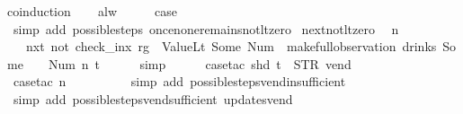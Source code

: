 \begin{isabellebody}
%
\isadelimproof
%
\endisadelimproof
%
\isatagproof
{}\isamarkupfalse%
{\isacharparenleft}coinduction{\isacharparenright}\isanewline
\ \ \isamarkupfalse%
\ alw\isanewline
\ \ \isamarkupfalse%
\ \isamarkupfalse%
\ {\isacharquery}case\isanewline
\ \ \ \ \isamarkupfalse%
\ {\isacharparenleft}simp\ add{\isacharcolon}\ possible{\isacharunderscore}steps{\isacharunderscore}{}\ once{\isacharunderscore}none{\isacharunderscore}remains{\isacharunderscore}not{\isacharunderscore}lt{\isacharunderscore}zero{\isacharparenright}\isanewline
{}\isamarkupfalse%
%
\endisatagproof
{\isafoldproof}%
%
\isadelimproof
\isanewline
%
\endisadelimproof
\isanewline
{}\isamarkupfalse%
\ next{\isacharunderscore}not{\isacharunderscore}lt{\isacharunderscore}zero{\isacharcolon}\isanewline
\ \ {\isachardoublequoteopen}n\ {\isasymge}\ {}\ {\isasymLongrightarrow}\isanewline
\ \ \ {\isacharparenleft}nxt\ {\isacharparenleft}not\ {\isacharparenleft}check_inx\ rg\ {}\ ValueLt\ {\isacharparenleft}Some\ {\isacharparenleft}Num\ {}{\isacharparenright}{\isacharparenright}{\isacharparenright}{\isacharparenright}{\isacharparenright}\ {\isacharparenleft}make{\isacharunderscore}full{\isacharunderscore}observation\ drinks\ {\isacharparenleft}Some\ {}{\isacharparenright}\ {\isacharparenleft}{\isacharless}{\isachargreater}{\isacharparenleft}{}\ {\isacharcolon}{\isacharequal}\ Num\ n{\isacharparenright}{\isacharparenright}\ t{\isacharparenright}{\isachardoublequoteclose}\isanewline
%
\isadelimproof
\ \ \ \ %
\endisadelimproof
%
\isatagproof
{}\isamarkupfalse%
\ simp\isanewline
\ \ \ \ \isamarkupfalse%
\ {\isacharparenleft}case{\isacharunderscore}tac\ {\isachardoublequoteopen}shd\ t\ {\isacharequal}\ {\isacharparenleft}STR\ {\isacharprime}{\isacharprime}vend{\isacharprime}{\isacharprime}{\isacharcomma}\ {\isacharbrackleft}{\isacharbrackright}{\isacharparenright}{\isachardoublequoteclose}{\isacharparenright}\isanewline
\ \ \ \ \isamarkupfalse%
\ {\isacharparenleft}case{\isacharunderscore}tac\ {\isachardoublequoteopen}n\ {\isacharequal}\ {}{\isachardoublequoteclose}{\isacharparenright}\isanewline
\ \ \ \ \ \ \isamarkupfalse%
\ {\isacharparenleft}simp\ add{\isacharcolon}\ possible{\isacharunderscore}steps{\isacharunderscore}vend{\isacharunderscore}insufficient{\isacharparenright}\isanewline
\ \ \ \ \ \isamarkupfalse%
\ {\isacharparenleft}simp\ add{\isacharcolon}\ possible{\isacharunderscore}steps{\isacharunderscore}vend{\isacharunderscore}sufficient\ updates{\isacharunderscore}vend{\isacharparenright}\isanewline

\end{isabellebody}
